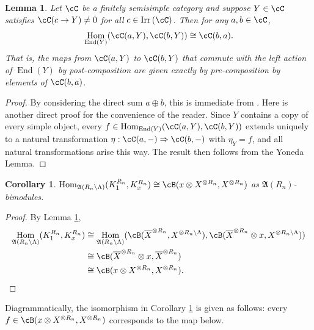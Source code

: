 \documentclass[11pt,reqno]{amsart}
\DeclareMathOperator{\End}{End}
\DeclareMathOperator{\Hom}{Hom}
\DeclareMathOperator{\Irr}{Irr}
\numberwithin{equation}{section}
\theoremstyle{plain}
\newtheorem{corollary}[equation]{Corollary}
\newtheorem{lemma}[equation]{Lemma}
\theoremstyle{definition}
\begin{document}
\begin{lemma}\label{lemma:yoneda}
    Let $\cC$ be a finitely semisimple category and suppose $Y\in\cC$ satisfies $\cC(c\to Y)\neq0$ for all $c\in\Irr{(\cC)}$. Then for any $a,b\in\cC$,
    \[
    \Hom_{\End(Y)}(\cC(a, Y),\cC(b, Y))\cong \cC(b, a).
    \]
    That is, the maps from $\cC(a, Y)$ to $\cC(b, Y)$ that commute with the left action of $\End(Y)$ by post-composition are given exactly by pre-composition by elements of $\cC(b, a)$.
\end{lemma}
\begin{proof}
By considering the direct sum $a\oplus b$, this is immediate from \cite[Semisimple Commutation Lemma 3.8]{2506.19969}.
Here is another direct proof for the convenience of the reader.
    Since $Y$ contains a copy of every simple object, every $f\in \Hom_{\End(Y)}(\cC(a, Y),\cC(b, Y))$ extends uniquely to a natural transformation $\eta:\cC(a,-)\Rightarrow\cC(b,-)$ with $\eta_Y=f$, and all natural transformations arise this way. 
    The result then follows from the Yoneda Lemma.
\end{proof}

\begin{corollary}\label{cor:rewrite-hom-space}
    $\Hom_{\mathfrak{A}(R_n\setminus \Lambda)}(K_1^{R_n},K_x^{R_n})\cong \cB(x\otimes X^{\otimes R_n}, X^{\otimes R_n})$ as $\mathfrak{A}(R_n)$-bimodules.
\end{corollary}
\begin{proof}
    By Lemma \ref{lemma:yoneda},
    \begin{align*}
        \Hom_{\mathfrak{A}(R_n\setminus \Lambda)}(K_1^{R_n},K_x^{R_n})
        &\cong \Hom_{\mathfrak{A}(R_n\setminus \Lambda)}(\cB(\overline{X}^{\otimes R_n}, X^{\otimes R_n\setminus\Lambda}),\cB(\overline{X}^{\otimes R_n}\otimes x, X^{\otimes R_n\setminus\Lambda})) \\
        &\cong \cB(\overline{X}^{\otimes R_n}\otimes x, \overline{X}^{\otimes R_n}) \\
        &\cong \cB(x\otimes X^{\otimes R_n}, X^{\otimes R_n}).
        \qedhere
    \end{align*}
\end{proof}
Diagrammatically, the isomorphism in Corollary \ref{cor:rewrite-hom-space} is given as follows: every $f\in \cB(x\otimes X^{\otimes R_n}, X^{\otimes R_n})$ corresponds to the map below.
\end{document}
